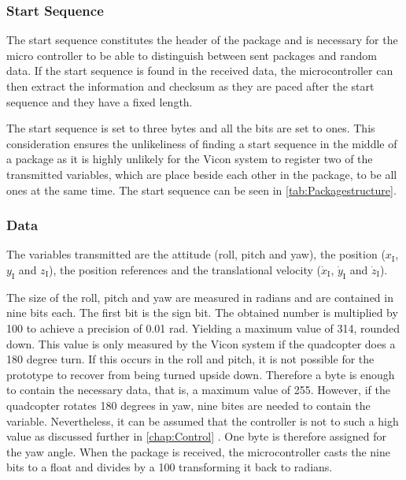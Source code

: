 \subsubsection{Start Sequence}
The start sequence constitutes the header of the package and is necessary for the micro controller to be able to distinguish between sent packages and random data. %
If the start sequence is found in the received data, the microcontroller can then extract the information and checksum as they are paced after the start sequence and they have a fixed length. 

The start sequence is set to three bytes and all the bits are set to ones. This consideration ensures the unlikeliness of finding a start sequence in the middle of a package as it is highly unlikely for the Vicon system to register two of the transmitted variables, which are place beside each other in the package, to be all ones at the same time. The start sequence can be seen in \autoref{tab:Packagestructure}.

\subsubsection{Data}
The variables transmitted are the attitude (roll, pitch and yaw), the position ($x_{\mathrm{I}}$, $y_{\mathrm{I}}$ and $z_{\mathrm{I}}$), the position references and the translational velocity ($\dot{x}_{\mathrm{I}}$, $\dot{y}_{\mathrm{I}}$ and $\dot{z}_{\mathrm{I}}$).

The size of the roll, pitch and yaw are measured in radians and are contained in nine bits each. The first bit is the sign bit. The obtained number is multiplied by 100 to achieve a precision of 0.01 rad. Yielding a maximum value of 314, rounded down. This value is only measured by the Vicon system if the quadcopter does a 180 degree turn. If this occurs in the roll and pitch, it is not possible for the prototype to recover from being turned upside down. Therefore a byte is enough to contain the necessary data, that is, a maximum value of 255. However, if the quadcopter rotates 180 degrees in yaw, nine bites are needed to contain the variable. Nevertheless, it can be assumed that the controller is not to such a high value as discussed further in \autoref{chap:Control} . One byte is therefore assigned for the yaw angle. When the package is received, the microcontroller casts the nine bits to a float and divides by a 100 transforming it back to radians.

